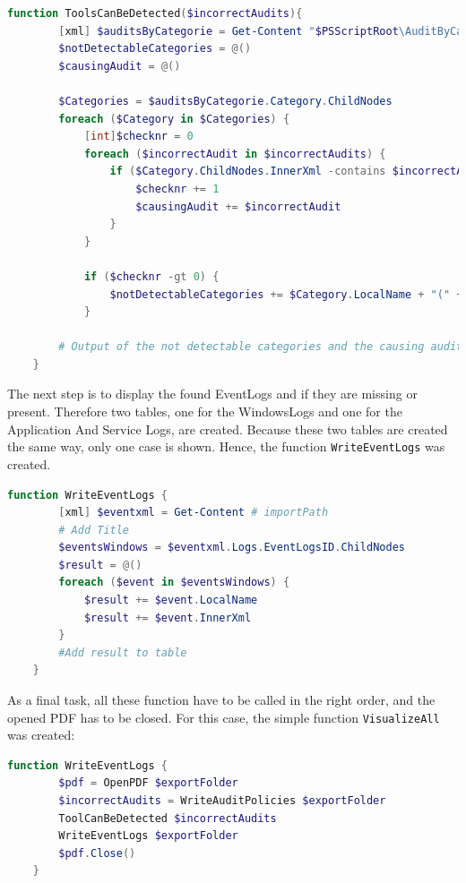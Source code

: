 \begin{lstlisting}[caption=Function ToolsCanBeDetected, language=PowerShell]
    function ToolsCanBeDetected($incorrectAudits){
        [xml] $auditsByCategorie = Get-Content "$PSScriptRoot\AuditByCategorie.xml"
        $notDetectableCategories = @()
        $causingAudit = @()

        $Categories = $auditsByCategorie.Category.ChildNodes
        foreach ($Category in $Categories) {
            [int]$checknr = 0
            foreach ($incorrectAudit in $incorrectAudits) {
                if ($Category.ChildNodes.InnerXml -contains $incorrectAudit) {
                    $checknr += 1
                    $causingAudit += $incorrectAudit
                }
            }
        
            if ($checknr -gt 0) {
                $notDetectableCategories += $Category.LocalName + "(" + $causingAudit + ")"
            }

        # Output of the not detectable categories and the causing audits    
    }
\end{lstlisting}
The next step is to display the found EventLogs and if they are missing or present. Therefore two tables, one for the WindowsLogs and one for the Application And Service Logs, are created. Because these two tables are created the same way, only one case is shown. Hence, the function \lstinline|WriteEventLogs| was created.
\begin{lstlisting}[caption=Function ToolsCanBeDetected, language=PowerShell]
    function WriteEventLogs { 
        [xml] $eventxml = Get-Content # importPath
        # Add Title
        $eventsWindows = $eventxml.Logs.EventLogsID.ChildNodes
        $result = @()
        foreach ($event in $eventsWindows) {
            $result += $event.LocalName
            $result += $event.InnerXml
        }
        #Add result to table
    }
\end{lstlisting}
As a final task, all these function have to be called in the right order, and the opened PDF has to be closed. For this case, the simple function \lstinline|VisualizeAll| was created:
\begin{lstlisting}[caption=Function VisualizeAll, language=PowerShell]
    function WriteEventLogs { 
        $pdf = OpenPDF $exportFolder
        $incorrectAudits = WriteAuditPolicies $exportFolder
        ToolCanBeDetected $incorrectAudits
        WriteEventLogs $exportFolder
        $pdf.Close()
    }
\end{lstlisting}

